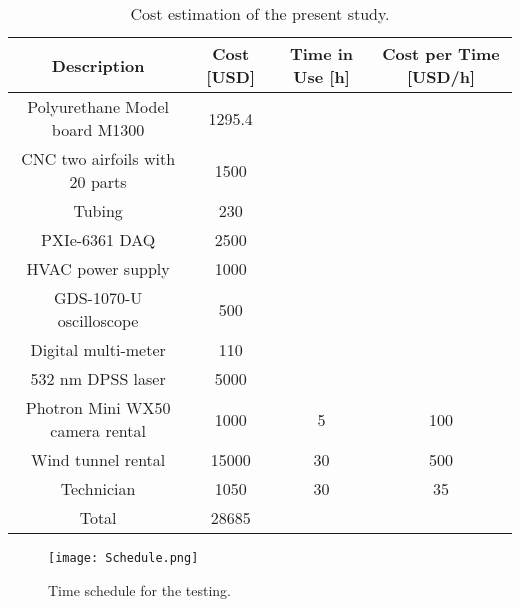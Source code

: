 \documentclass[fleqn,10pt]{SelfArx} %
\begin{document}
\begin{table}[hbt]
\caption{Cost estimation of the present study.}
\centering
\begin{tabular}{cccc}
\hline
Description                     & Cost {[}USD{]} & Time in Use {[}h{]} & Cost per Time {[}USD/h{]} \\
\hline \hline
Polyurethane Model board M1300  & 1295.4         &                     &                           \\
CNC two airfoils with 20 parts  & 1500           &                     &                           \\
Tubing                          & 230            &                     &                           \\
PXIe-6361 DAQ                   & 2500           &                     &                           \\
HVAC power supply               & 1000           &                     &                           \\
GDS-1070-U oscilloscope         & 500            &                     &                           \\
Digital multi-meter             & 110            &                     &                           \\
532 nm DPSS laser               & 5000           &                     &                           \\
Photron Mini WX50 camera rental & 1000           & 5                   & 100                       \\
Wind tunnel    rental           & 15000          & 30                  & 500                       \\
Technician                      & 1050            & 30                  & 35   \\
\hline
Total                           & 28685          &                     &      \\
\hline
\end{tabular}
\label{teable_shite_costs_1}
\end{table}

\begin{figure}[ht]\centering
\texttt{[image: Schedule.png]}
\caption{Time schedule for the testing.}
\label{fig_fuck_all_you_niggas_1}
\end{figure}
\end{document}
